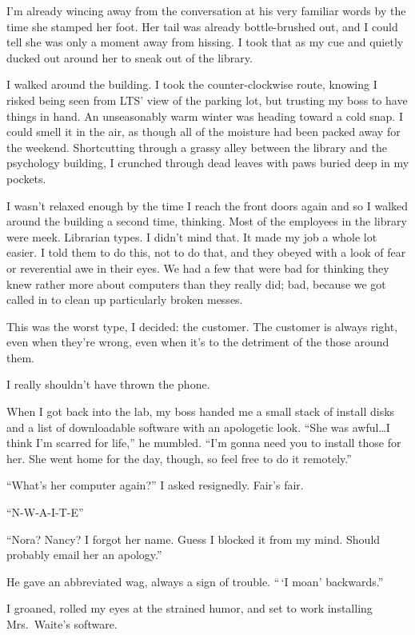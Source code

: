 I'm already wincing away from the conversation at his very familiar words by the time she stamped her foot. Her tail was already bottle-brushed out, and I could tell she was only a moment away from hissing. I took that as my cue and quietly ducked out around her to sneak out of the library.

I walked around the building. I took the counter-clockwise route, knowing I risked being seen from LTS' view of the parking lot, but trusting my boss to have things in hand. An unseasonably warm winter was heading toward a cold snap. I could smell it in the air, as though all of the moisture had been packed away for the weekend. Shortcutting through a grassy alley between the library and the psychology building, I crunched through dead leaves with paws buried deep in my pockets.

I wasn't relaxed enough by the time I reach the front doors again and so I walked around the building a second time, thinking. Most of the employees in the library were meek. Librarian types. I didn't mind that. It made my job a whole lot easier. I told them to do this, not to do that, and they obeyed with a look of fear or reverential awe in their eyes. We had a few that were bad for thinking they knew rather more about computers than they really did; bad, because we got called in to clean up particularly broken messes.

This was the worst type, I decided: the customer. The customer is always right, even when they're wrong, even when it's to the detriment of the those around them.

I really shouldn't have thrown the phone.

When I got back into the lab, my boss handed me a small stack of install disks and a list of downloadable software with an apologetic look. ``She was awful\ldots{}I think I'm scarred for life,'' he mumbled. ``I'm gonna need you to install those for her. She went home for the day, though, so feel free to do it remotely.''

``What's her computer again?'' I asked resignedly. Fair's fair.

``N-W-A-I-T-E''

``Nora? Nancy? I forgot her name. Guess I blocked it from my mind. Should probably email her an apology.''

He gave an abbreviated wag, always a sign of trouble. ``\,`I moan' backwards.''

I groaned, rolled my eyes at the strained humor, and set to work installing Mrs.~Waite's software.

